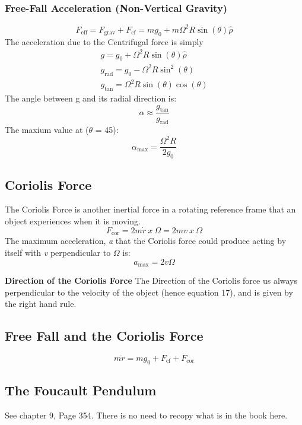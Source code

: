 \documentclass[11pt]{article}
\theoremstyle{definition}
\begin{document}
\subsubsection*{Free-Fall Acceleration (Non-Vertical Gravity)}
\begin{equation}
F_{\text{eff}} = F_{\text{grav}} + F_{\text{cf}} = mg_0 + m\Omega^2R\sin(\theta)\hat{\rho}
\end{equation}
The acceleration due to the Centrifugal force is simply 
\begin{equation}
\begin{split}
g = g_0 + \Omega^2R\sin(\theta)\hat{\rho} \\
g_{\text{rad}} = g_0 - \Omega^2R\sin^2(\theta)  \\
g_{\text{tan}} = \Omega^2R\sin(\theta)\cos(\theta)
\end{split}
\end{equation}
The angle between g and its radial direction is:
\begin{equation}
\alpha \approx \frac{g_{\text{tan}}}{g_{\text{rad}}} 
\end{equation}
The maxium value at ($\theta$ = 45):
\begin{equation}
\alpha_{\text{max}} =  \frac{\Omega^2R}{2g_0}
\end{equation}
\subsection{Coriolis Force}
The Coriolis Force is another inertial force in a rotating reference frame that an object experiences when it is moving. 
\begin{equation}
F_{\text{cor}} = 2m\dot{r} \ x \ \Omega = 2mv \ x \ \Omega
\end{equation}
The maximum acceleration, \textit{a} that the Coriolis force could produce acting by itself with \textit{v} perpendicular to $\Omega$ is:
\begin{equation}
a_{\text{max}} = 2v\Omega 
\end{equation}
\begin{shaded}
\textbf{Direction of the Coriolis Force} \newline
The Direction of the Coriolis force us always perpendicular to the velocity of the object (hence equation 17), and is given by the right hand rule. 
\end{shaded}
\newpage
\subsection{Free Fall and the Coriolis Force}
\begin{equation}
m\ddot{r} = mg_0 + F_{\text{cf}} + F_{\text{cor}} 
\end{equation}
\subsection{The Foucault Pendulum}
See chapter 9, Page 354. There is no need to recopy what is in the book here. 
\end{document}
